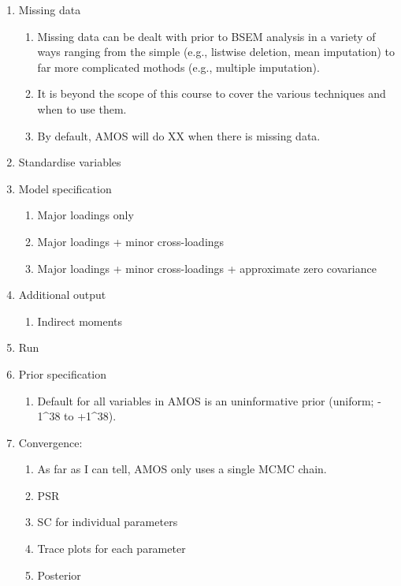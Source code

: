 \documentclass[]{book}
\providecommand{\tightlist}{%
  \setlength{\itemsep}{0pt}\setlength{\parskip}{0pt}}
\begin{document}
\begin{enumerate}
\def\labelenumi{\arabic{enumi}.}
\tightlist
\item
  Missing data

  \begin{enumerate}
  \def\labelenumii{\arabic{enumii}.}
  \tightlist
  \item
    Missing data can be dealt with prior to BSEM analysis in a variety of ways ranging from the simple (e.g., listwise deletion, mean imputation) to far more complicated mothods (e.g., multiple imputation).
  \item
    It is beyond the scope of this course to cover the various techniques and when to use them.
  \item
    By default, AMOS will do XX when there is missing data.
  \end{enumerate}
\item
  Standardise variables
\item
  Model specification

  \begin{enumerate}
  \def\labelenumii{\arabic{enumii}.}
  \tightlist
  \item
    Major loadings only
  \item
    Major loadings + minor cross-loadings
  \item
    Major loadings + minor cross-loadings + approximate zero covariance
  \end{enumerate}
\item
  Additional output

  \begin{enumerate}
  \def\labelenumii{\arabic{enumii}.}
  \tightlist
  \item
    Indirect moments
  \end{enumerate}
\item
  Run
\item
  Prior specification

  \begin{enumerate}
  \def\labelenumii{\arabic{enumii}.}
  \tightlist
  \item
    Default for all variables in AMOS is an uninformative prior (uniform; - 1\^{}38 to +1\^{}38).
  \end{enumerate}
\item
  Convergence:

  \begin{enumerate}
  \def\labelenumii{\arabic{enumii}.}
  \tightlist
  \item
    As far as I can tell, AMOS only uses a single MCMC chain.
  \item
    PSR
  \item
    SC for individual parameters
  \item
    Trace plots for each parameter
  \item
    Posterior


\end{enumerate}
\end{enumerate}
\end{document}
